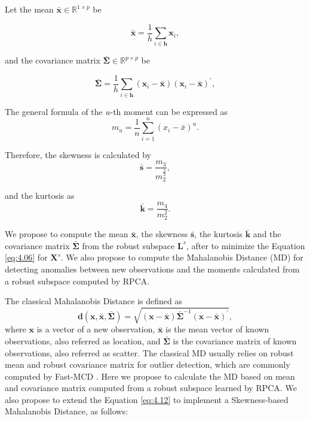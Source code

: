 Let the mean $\bar{\boldsymbol{x}} \in \mathbb{R}^{1 \times p}$ be

\begin{equation}\label{eq:4.07}
	\bar{\boldsymbol{x}} = \displaystyle\frac{1}{h}\displaystyle\sum_{i\in \boldsymbol{h}} \boldsymbol{x}_i, 
\end{equation}

and the covariance matrix $\boldsymbol{\bar{\Sigma}} \in \mathbb{R}^{p \times p}$ be

\begin{equation}\label{eq:4.08}
	\boldsymbol{\bar{\Sigma}} = \displaystyle\frac{1}{h}\displaystyle\sum_{i\in \boldsymbol{h}} (\boldsymbol{x}_i - \bar{\boldsymbol{x}})(\boldsymbol{x}_i - \bar{\boldsymbol{x}})^\prime,
\end{equation}

The general formula of the $u$-th moment can be expressed as
\begin{equation}\label{eq:4.09}
	m_u = \displaystyle\frac{1}{n}\displaystyle\sum_{i = 1}^{n}( x_i - \bar{x})^u.
\end{equation}

Therefore, the skewness is calculated by
\begin{equation}\label{eq:4.10}
	\boldsymbol{\bar{s}} = \frac{m_3}{m_2^{\frac{3}{2}}},
\end{equation}

and the kurtosis as
\begin{equation}\label{eq:4.11}
	\boldsymbol{\bar{k}} = \frac{m_4}{m_2^2}.
\end{equation}

We propose to compute the mean $\boldsymbol{\bar{x}}$, the skewness $\boldsymbol{\bar{s}}$, the kurtosis $\boldsymbol{\bar{k}}$ and the covariance matrix $\boldsymbol{\bar{\Sigma}}$ from the robust subspace $\boldsymbol{L}^s$, after to minimize the Equation \ref{eq:4.06} for $\textbf{X}^s$. We also propose to compute the Mahalanobis Distance (MD) for detecting anomalies between new observations and the moments calculated from a robust subspace computed by RPCA. 

The classical Mahalanobis Distance is defined as		
\begin{equation}\label{eq:4.12}
	\boldsymbol{d}(\boldsymbol{x},\bar{\boldsymbol{x}}, \boldsymbol{\bar{\Sigma}}) = \sqrt{(\boldsymbol{x} - \bar{\boldsymbol{x}}) \boldsymbol{\bar{\Sigma}}^{-1}(\boldsymbol{x} - \bar{\boldsymbol{x}})^\prime},
\end{equation}
where $\boldsymbol{x}$ is a vector of a new observation, $\bar{\boldsymbol{x}}$ is the mean vector of known observations, also referred as location, and $\boldsymbol{\bar{\Sigma}}$ is the covariance matrix of known observations, also referred as scatter. The classical MD usually relies on robust mean and robust covariance matrix for outlier detection, which are commonly computed by Fast-MCD \cite{rousseeuw1984mcd, rousseeuw1999fastmcd}. Here we propose to calculate the MD based on mean and covariance matrix computed from a robust subspace learned by RPCA. We also propose to extend the Equation \ref{eq:4.12} to implement a Skewness-based Mahalanobis Distance, as follows:

